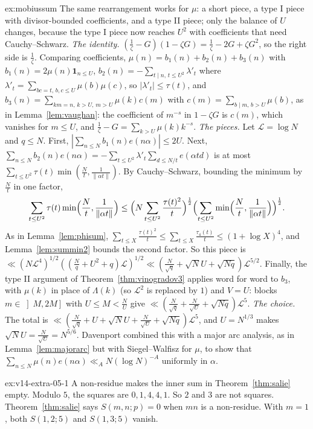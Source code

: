 \begin{solution}{ex:mobiussum}
\idea The same rearrangement works for $\mu$: a short piece, a type I piece with divisor-bounded coefficients, and a type II piece; only the balance of $U$ changes, because the type I piece now reaches $U^2$ with coefficients that need Cauchy--Schwarz.
\writeup \emph{The identity.} $(\frac1\zeta-G)(1-\zeta G)=\frac1\zeta-2G+\zeta G^2$, so the right side is $\frac1\zeta$. Comparing coefficients, $\mu(n)=b_1(n)+b_2(n)+b_3(n)$ with $b_1(n)=2\mu(n)\mathbf 1_{n\le U}$, $b_2(n)=-\sum_{t\mid n,\,t\le U^2}\lambda'_t$ where $\lambda'_t=\sum_{bc=t,\,b,c\le U}\mu(b)\mu(c)$, so $|\lambda'_t|\le\tau(t)$, and $b_3(n)=\sum_{km=n,\,k>U,\,m>U}\mu(k)c(m)$ with $c(m)=\sum_{b\mid m,\,b>U}\mu(b)$, as in Lemma~\ref{lem:vaughan}: the coefficient of $m^{-s}$ in $1-\zeta G$ is $c(m)$, which vanishes for $m\le U$, and $\frac1\zeta-G=\sum_{k>U}\mu(k)k^{-s}$.
\emph{The pieces.} Let $\mathcal L=\log N$ and $q\le N$. First, $|\sum_{n\le N}b_1(n)e(n\alpha)|\le2U$. Next, $\sum_{n\le N}b_2(n)e(n\alpha)=-\sum_{t\le U^2}\lambda'_t\sum_{d\le N/t}e(\alpha td)$ is at most $\sum_{t\le U^2}\tau(t)\min(\frac Nt,\frac1{\|\alpha t\|})$. By Cauchy--Schwarz, bounding the minimum by $\frac Nt$ in one factor,
\[
\sum_{t\le U^2}\tau(t)\min\Bigl(\frac Nt,\frac1{\|\alpha t\|}\Bigr)\le\Bigl(N\sum_{t\le U^2}\frac{\tau(t)^2}t\Bigr)^{\frac12}\Bigl(\sum_{t\le U^2}\min\Bigl(\frac Nt,\frac1{\|\alpha t\|}\Bigr)\Bigr)^{\frac12}.
\]
As in Lemma~\ref{lem:phisum}, $\sum_{t\le X}\frac{\tau(t)^2}t\le\sum_{t\le X}\frac{\tau_4(t)}t\le(1+\log X)^4$, and Lemma~\ref{lem:summin2} bounds the second factor. So this piece is $\ll(N\mathcal L^4)^{1/2}((\frac Nq+U^2+q)\mathcal L)^{1/2}\ll(\frac N{\sqrt q}+\sqrt NU+\sqrt{Nq})\mathcal L^{5/2}$. Finally, the type II argument of Theorem~\ref{thm:vinogradov3} applies word for word to $b_3$, with $\mu(k)$ in place of $\Lambda(k)$ (so $\mathcal L^2$ is replaced by $1$) and $V=U$: blocks $m\in\left]M,2M\right]$ with $U\le M<\frac NU$ give $\ll(\frac N{\sqrt q}+\frac N{\sqrt U}+\sqrt{Nq})\mathcal L^5$.
\emph{The choice.} The total is $\ll(\frac N{\sqrt q}+U+\sqrt NU+\frac N{\sqrt U}+\sqrt{Nq})\mathcal L^5$, and $U=N^{1/3}$ makes $\sqrt NU=\frac N{\sqrt U}=N^{5/6}$. Davenport combined this with a major arc analysis, as in Lemma~\ref{lem:majorarc} but with Siegel--Walfisz for $\mu$, to show that $\sum_{n\le N}\mu(n)e(n\alpha)\ll_AN(\log N)^{-A}$ uniformly in $\alpha$.
\end{solution}

\begin{solution}{ex:v14-extra-05-1}
\idea A non-residue makes the inner sum in Theorem~\ref{thm:salie} empty.
\writeup Modulo $5$, the squares are $0,1,4,4,1$. So $2$ and $3$ are not squares. Theorem~\ref{thm:salie} says $S(m,n;p)=0$ when $mn$ is a non-residue. With $m=1$, both $S(1,2;5)$ and $S(1,3;5)$ vanish.
\end{solution}

